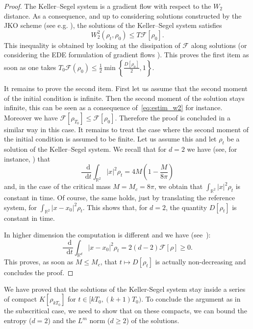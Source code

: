 \documentclass[11pt,a4paper]{article}
\numberwithin{equation}{section}
\newcommand{\R}{{\mathbb{R}}}
\theoremstyle{plain}
\theoremstyle{remark}
\newcommand {\f}{\frac}
\newcommand{\diff}{\mathop{}\!\mathrm{d}}
\begin{document}
\begin{proof}
The Keller--Segel system is a gradient flow with respect to the $W_2$ distance. As a consequence, and up to considering solutions constructed by the JKO scheme (see e.g. \cite{Blanchet_Calvez_Carrillo08}), the solutions of the Keller--Segel system satisfies 
\begin{equation}\label{eq:estim_w2}
W_{2}^2(\rho_t, \rho_{0})\le T\mathcal{F}[\rho_0].
\end{equation}
This inequality is obtained by looking at the dissipation of $\mathcal F$ along solutions (or considering the EDE formulation of gradient flows \cite[Chapter 14]{Ambrosio_Brue_Semola21}). This proves the first item as soon as one takes $T_0\mathcal F(\rho_0)\leq \frac{1}{2}\min\left\{\frac{D[\rho_0]}{2},1\right\} $.

It remains to prove the second item. First let us assume that the second moment of the initial condition is infinite. Then the second moment of the solution stays infinite, this can be seen as a consequence of~\eqref{eq:estim_w2} for instance. Moreover we have $\mathcal{F}[\rho_{T_0}]\le \mathcal{F}[\rho_0]$. Therefore the proof is concluded in a similar way in this case. It remains to treat the case where the second moment of the initial condition is assumed to be finite. Let us assume this and let $\rho_t$ be a solution of the Keller--Segel system. We recall that for $d=2$ we have (see, for instance, \cite{Blanchet_Dolbeault_Perthame06}) that 
$$
    \f{\diff}{\diff t}\int_{\R^2}|x|^2\rho_t =4M \left(1-\f{M}{8\pi} \right) 
$$
and, in the case of the critical mass $M=M_c=8\pi$, we obtain that $\int_{\R^2}|x|^2\rho_t$ is constant in time. Of course, the same holds, just by translating the reference system, for $\int_{\R^2}|x-x_0|^2\rho_t$. This shows that, for $d=2$, the quantity $D[\rho_t]$ is constant in time. 

In higher dimension the computation is different and we have (see~\cite{Blanchet_Carrillo_Laurencot09}): 
$$
\f{\diff}{\diff t}\int_{\R^d}|x-x_0|^2 \rho_t = 2(d-2)\mathcal{F}[\rho]\ge 0.
$$
This proves, as soon as $M\leq M_c$, that $t\mapsto D[\rho_t]$ is actually non-decreasing and concludes the proof. \qedhere
\end{proof}


We have proved that the solutions of the Keller-Segel system stay inside a series of compact $K[\rho_{kT_0}]$ for $t\in[kT_0, (k+1)T_0)$. To conclude the argument as in the subscritical case, we need to show that on these compacts, we can bound the entropy ($d=2$) and the $L^m$ norm ($d\ge 2$) of the solutions. 
\end{document}
